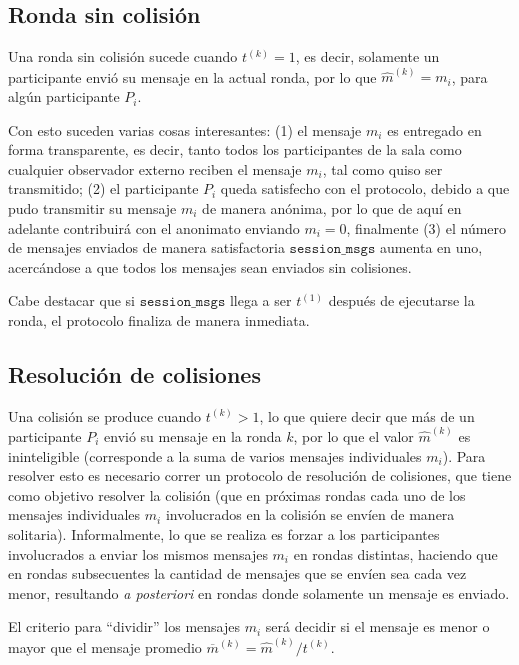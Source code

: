 \subsection{Ronda sin colisión}

Una ronda sin colisión sucede cuando $t^{(k)} = 1$, es decir, solamente un participante 
envió su mensaje en la actual ronda, por lo que $\hat{m}^{(k)} = m_i$, para algún 
participante $P_i$.

Con esto suceden varias cosas interesantes: (1) el mensaje $m_i$ es entregado en forma 
transparente, es decir, tanto todos los participantes de la sala como cualquier observador 
externo reciben el mensaje $m_i$, tal como quiso ser transmitido; (2) el participante $P_i$ 
queda satisfecho con el protocolo, debido a que pudo transmitir su mensaje $m_i$ de manera 
anónima, por lo que de aquí en adelante contribuirá con el anonimato enviando $m_i = 0$, 
finalmente (3) el número de mensajes enviados de manera satisfactoria $\mathtt{session\_msgs}$ 
aumenta en uno, acercándose a que todos los mensajes sean enviados sin colisiones.

Cabe destacar que si $\mathtt{session\_msgs}$ llega a ser $t^{(1)}$ después de ejecutarse 
la ronda, el protocolo finaliza de manera inmediata.

\subsection{Resolución de colisiones}

Una colisión se produce cuando $t^{(k)} > 1$, lo que quiere decir que más de un 
participante $P_i$ envió su mensaje en la ronda $k$, por lo que el valor $\hat{m}^{(k)}$ 
es ininteligible (corresponde a la suma de varios mensajes individuales $m_i$). Para resolver 
esto es necesario correr un protocolo de resolución de colisiones, que tiene como objetivo 
resolver la colisión (que en próximas rondas cada uno de los mensajes individuales $m_i$ 
involucrados en la colisión se envíen de manera solitaria). Informalmente, lo que se realiza 
es forzar a los participantes involucrados a enviar los mismos mensajes $m_i$ en rondas 
distintas, haciendo que en rondas subsecuentes la cantidad de mensajes que se envíen sea 
cada vez menor, resultando \emph{a posteriori} en rondas donde solamente un mensaje es enviado.

El criterio para ``dividir'' los mensajes $m_i$ será decidir si el mensaje es menor o mayor que 
el mensaje promedio $\overline{m}^{(k)} = \hat{m}^{(k)} / t^{(k)}$.

